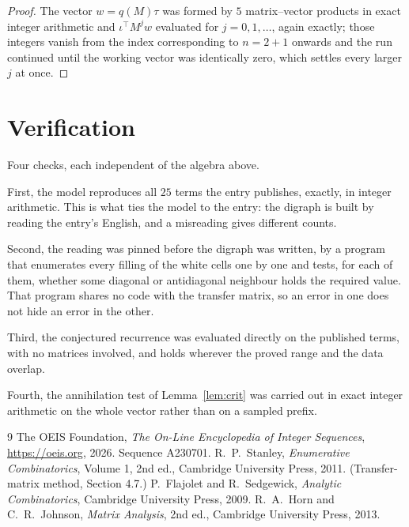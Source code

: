 \documentclass[11pt,a4paper]{article}
\theoremstyle{plain}
\theoremstyle{definition}
\begin{document}
\begin{proof}
The vector $w=q(M)\tau$ was formed by $5$ matrix--vector products in exact integer
arithmetic and $\iota^{\!\top}M^{j}w$ evaluated for $j=0,1,\dots$, again exactly; those
integers vanish from the index corresponding to $n=2+1$ onwards and the run continued
until the working vector was identically zero, which settles every larger $j$ at once.
\end{proof}

\section{Verification}

Four checks, each independent of the algebra above.

First, the model reproduces all $25$ terms the entry publishes, exactly, in integer
arithmetic. This is what ties the model to the entry: the digraph is built by reading the
entry's English, and a misreading gives different counts.

Second, the reading was pinned before the digraph was written, by a program that enumerates
every filling of the white cells one by one and tests, for each of them, whether some
diagonal or antidiagonal neighbour holds the required value. That program shares no code with the transfer matrix, so an error in one does not
hide an error in the other.

Third, the conjectured recurrence was evaluated directly on the published terms, with no
matrices involved, and holds wherever the proved range and the data overlap.

Fourth, the annihilation test of Lemma~\ref{lem:crit} was carried out in exact integer
arithmetic on the whole vector rather than on a sampled prefix.

\begin{thebibliography}{9}
 The OEIS Foundation, \emph{The On-Line Encyclopedia of Integer
Sequences}, \url{https://oeis.org}, 2026. Sequence A230701.
 R.~P.~Stanley, \emph{Enumerative Combinatorics}, Volume 1, 2nd ed.,
Cambridge University Press, 2011. (Transfer-matrix method, Section 4.7.)
 P.~Flajolet and R.~Sedgewick, \emph{Analytic Combinatorics}, Cambridge
University Press, 2009.
 R.~A.~Horn and C.~R.~Johnson, \emph{Matrix Analysis}, 2nd ed., Cambridge
University Press, 2013.
\end{thebibliography}
\end{document}
